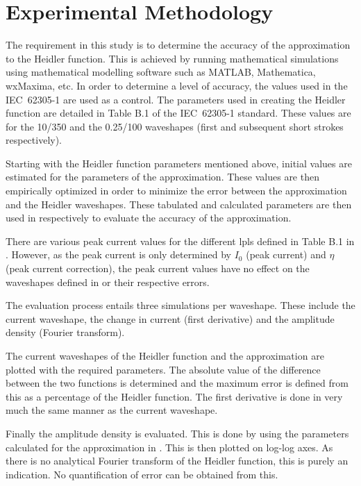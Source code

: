 \section{Experimental Methodology}
\label{sec:results_experimental_methodology}
The requirement in this study is to determine the accuracy of the approximation to the Heidler function. This is achieved by running mathematical simulations using mathematical modelling software such as MATLAB, Mathematica, wxMaxima, etc. In order to determine a level of accuracy, the values used in the IEC~62305-1 are used as a control. The parameters used in creating the Heidler function are detailed in Table B.1 of the IEC~62305-1 standard. These values are for the 10/350 and the 0.25/100 waveshapes (first and subsequent short strokes respectively).

Starting with the Heidler function parameters mentioned above, initial values are estimated for the parameters of the approximation. These values are then empirically optimized in order to minimize the error between the approximation and the Heidler waveshapes. These tabulated and calculated parameters are then used in  respectively to evaluate the accuracy of the approximation.

There are various peak current values for the different \glspl{lpl} defined in Table B.1 in \cite{IEC623051}. However, as the peak current is only determined by $I_0$ (peak current) and $\eta$ (peak current correction), the peak current values have no effect on the waveshapes defined in  or their respective errors.

The evaluation process entails three simulations per waveshape. These include the current waveshape, the change in current (first derivative) and the amplitude density (Fourier transform).

The current waveshapes of the Heidler function and the approximation are plotted with the required parameters. The absolute value of the difference between the two functions is determined and the maximum error is defined from this as a percentage of the Heidler function. The first derivative is done in very much the same manner as the current waveshape.

Finally the amplitude density is evaluated. This is done by using the parameters calculated for the approximation in . This is then plotted on log-log axes. As there is no analytical Fourier transform of the Heidler function, this is purely an indication. No quantification of error can be obtained from this.

